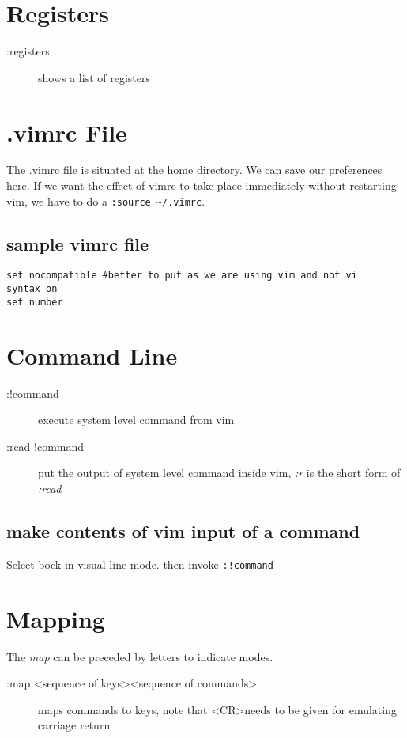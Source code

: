 \documentclass[a4paper, 12pt]{article}
\begin{document}
\section{Registers}
\begin{description}
	\item[:registers] shows a list of registers	
\end{description}

\section{.vimrc File}
The .vimrc file is situated at the home directory. We can save our preferences here. If we want the effect of vimrc to take place immediately without restarting vim, we have to do a \verb|:source ~/.vimrc|.

\subsection{sample vimrc file}
\begin{verbatim}
set nocompatible #better to put as we are using vim and not vi
syntax on
set number
\end{verbatim}

\section{Command Line}
\begin{description}
	\item[:!command] execute system level command from vim	
	\item[:read !command] put the output of system level command inside vim, \emph{:r} is the short form of \emph{:read}
\end{description}

\subsection{make contents of vim input of a command}
Select bock in visual line mode. then invoke \verb|:!command|

\section{Mapping}
The \emph{map} can be preceded by letters to indicate modes.
\begin{description}
	\item[:map \textless sequence of keys\textgreater \textless sequence of commands\textgreater] maps commands to keys, note that \textless CR\textgreater needs to be given for emulating carriage return
\end{description}
\end{document}
